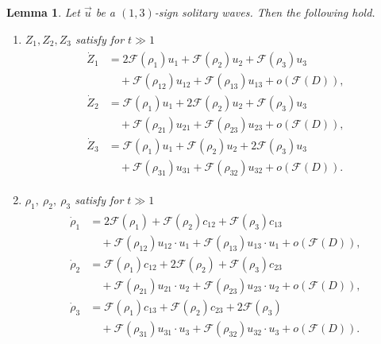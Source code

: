 \documentclass[reqno]{amsart}
\theoremstyle{plain}
\newtheorem{lemma}[theorem]{Lemma}
\theoremstyle{definition}
\numberwithin{equation}{section}
\newcommand{\1}{\mathbbm{1}}
\begin{document}
\begin{lemma}\label{daijisiki}
Let $\vec{u}$ be a $(1,3)$-sign solitary waves. Then the following hold.
\begin{enumerate}
\item $Z_1,Z_2,Z_3$ satisfy for $t\gg 1$
\begin{align}\label{Zes1}
\begin{aligned}
\dot{Z}_1&=2\mathcal{F}(\rho_1)u_1+\mathcal{F}(\rho_2)u_2+\mathcal{F}(\rho_3)u_3
\\
&\quad +\mathcal{F}(\rho_{12})u_{12}+\mathcal{F}(\rho_{13})u_{13}+o\left(\mathcal{F}(D)\right),
\\
\dot{Z}_2&=\mathcal{F}(\rho_1)u_1+2\mathcal{F}(\rho_2)u_2+\mathcal{F}(\rho_3)u_3
\\
&\quad+\mathcal{F}(\rho_{21})u_{21}+\mathcal{F}(\rho_{23})u_{23}+o\left(\mathcal{F}(D)\right),
\\
\dot{Z}_3&=\mathcal{F}(\rho_1)u_1+\mathcal{F}(\rho_2)u_2+2\mathcal{F}(\rho_3)u_3
\\
&\quad +\mathcal{F}(\rho_{31})u_{31}+\mathcal{F}(\rho_{32})u_{32}+o\left(\mathcal{F}(D)\right).
\end{aligned}
\end{align}

\item $\rho_1,\ \rho_2,\ \rho_3$ satisfy for $t\gg 1$
\begin{align}\label{rhoes1}
\begin{aligned}
\dot{\rho}_1&=2\mathcal{F}(\rho_1)+\mathcal{F}(\rho_2)c_{12}+\mathcal{F}(\rho_3)c_{13}
\\
&\quad+\mathcal{F}(\rho_{12})u_{12}\cdot u_1+\mathcal{F}(\rho_{13})u_{13}\cdot u_1+o\left(\mathcal{F}(D)\right),
\\
\dot{\rho}_2&=\mathcal{F}(\rho_1)c_{12}+2\mathcal{F}(\rho_2)+\mathcal{F}(\rho_3)c_{23}
\\
&\quad+\mathcal{F}(\rho_{21})u_{21}\cdot u_2+\mathcal{F}(\rho_{23})u_{23}\cdot u_2+o\left(\mathcal{F}(D)\right),
\\
\dot{\rho}_3&=\mathcal{F}(\rho_{1})c_{13}+\mathcal{F}(\rho_2)c_{23}+2\mathcal{F}(\rho_3)
\\
&\quad+\mathcal{F}(\rho_{31})u_{31}\cdot u_3+\mathcal{F}(\rho_{32})u_{32}\cdot u_3+o\left(\mathcal{F}(D)\right).
\end{aligned}
\end{align}


\end{enumerate}
\end{lemma}
\end{document}
